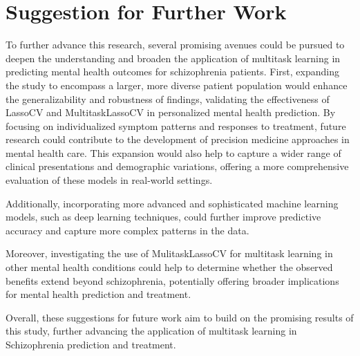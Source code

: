 \goodbreak
\section{Suggestion for Further Work}
To further advance this research, several promising avenues could be pursued to deepen the understanding and broaden the application of multitask learning in predicting mental health outcomes for schizophrenia patients. First, expanding the study to encompass a larger, more diverse patient population would enhance the generalizability and robustness of findings, validating the effectiveness of LassoCV and MultitaskLassoCV in personalized mental health prediction. By focusing on individualized symptom patterns and responses to treatment, future research could contribute to the development of precision medicine approaches in mental health care. This expansion would also help to capture a wider range of clinical presentations and demographic variations, offering a more comprehensive evaluation of these models in real-world settings.

Additionally, incorporating more advanced and sophisticated machine learning models, such as deep learning techniques, could further improve predictive accuracy and capture more complex patterns in the data.


Moreover, investigating the use of MulitaskLassoCV for multitask learning in other mental health conditions could help to determine whether the observed benefits extend beyond schizophrenia, potentially offering broader implications for mental health prediction and treatment.

Overall, these suggestions for future work aim to build on the promising results of this study, further advancing the application of multitask learning in Schizophrenia prediction and treatment.


